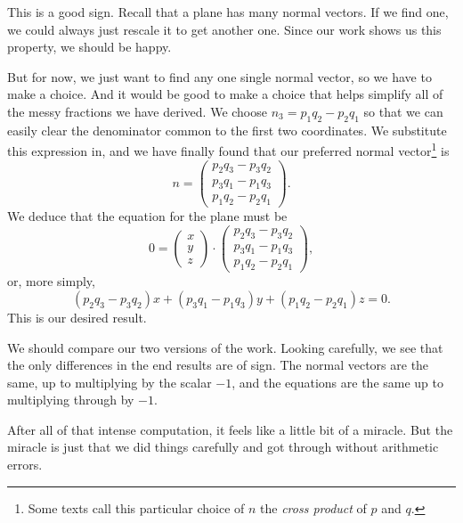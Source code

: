 \documentclass[00-livre-main.tex]{subfiles}
\begin{document}
This is a good sign. Recall that a plane has many normal vectors. If we find one, we could always just rescale it to get another one. Since our work shows us this property, we should be happy. 

But for now, we just want to find any one single normal vector, so we have to make a choice. And it would be good to make a choice that helps simplify all of the messy fractions we have derived. We choose $n_3 = p_1q_2 - p_2q_1$ so that we can easily clear the denominator common to the first two coordinates. We substitute this expression in, and we have finally found that our preferred normal vector\footnote{Some texts call this particular choice of $n$ the \emph{cross product} of $p$ and $q$.} is
\[
n = \begin{pmatrix} p_2 q_3 - p_3 q_2 \\
p_3 q_1 - p_1 q_3 \\ p_1 q_2 - p_2 q_1 \end{pmatrix}.
\]
We deduce that the equation for the plane must be
\[
0 = \begin{pmatrix}x \\ y \\ z \end{pmatrix} \cdot \begin{pmatrix} p_2 q_3 - p_3 q_2 \\
p_3 q_1 - p_1 q_3 \\ p_1 q_2 - p_2 q_1 \end{pmatrix},
\]
or, more simply, 
\[
(p_2 q_3 - p_3 q_2) x +
(p_3 q_1 - p_1 q_3) y +
(p_1 q_2 - p_2 q_1) z = 0.
\]
This is our desired result.

We should compare our two versions of the work. Looking carefully, we see that the only differences in the end results are of sign. The normal vectors are the same, up to multiplying by the scalar $-1$, and the equations are the same up to multiplying through by $-1$.

After all of that intense computation, it feels like a little bit of a miracle. But the miracle is just that we did things carefully and got through without arithmetic errors.
\end{document}
